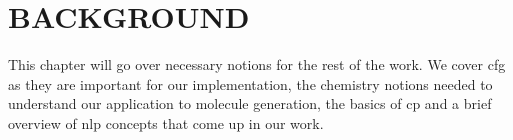 \documentclass[../Document.tex]{subfiles}
\begin{document}
\chapter{BACKGROUND}
\label{chap:background}
This chapter will go over necessary notions for the rest of the work.
We cover \gls{cfg} as they are important for our implementation, the chemistry notions needed to understand our application to molecule generation, the basics of \acrlong{cp} and a brief overview of \gls{nlp} concepts that come up in our work.












\end{document}
